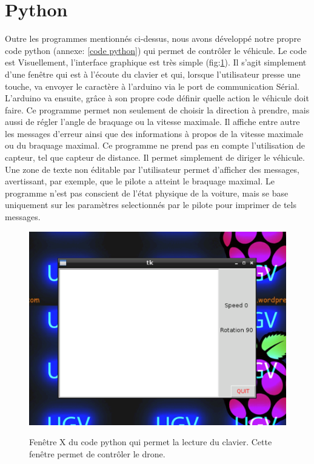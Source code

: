 \documentclass[a4paper,12pt]{report}
\begin{document}
{\section{Python}
Outre les programmes mentionnés ci-dessus, nous avons développé notre propre
code python (annexe: \ref{code python}) qui permet de contrôler le
véhicule. Le code est  Visuellement, l'interface graphique est très simple
(fig:\ref{python environnement}). Il s'agit simplement d'une fenêtre qui est à
l'écoute du clavier et qui, lorsque l'utilisateur presse une touche, va
envoyer le caractère à l'arduino via le port de communication
Sérial. L'arduino va ensuite, grâce à son propre code définir quelle action le
véhicule doit faire. Ce programme permet non seulement de choisir la direction
à prendre, mais aussi de régler l'angle de braquage ou la vitesse maximale. Il
affiche entre autre les messages d'erreur ainsi que des informations à propos
de la vitesse maximale ou du braquage maximal. Ce programme ne prend pas en
compte l'utilisation de capteur, tel que capteur de distance. Il permet
simplement de diriger le véhicule. Une zone de texte non éditable par
l'utilisateur permet d'afficher des messages, avertissant, par exemple, que le
pilote a atteint le braquage maximal. Le programme n'est pas conscient de
l'état physique de la voiture, mais se base uniquement sur les paramètres
selectionnés par le pilote pour imprimer de tels messages. 

\begin{center}
\begin{figure}[!h]
\includegraphics[scale=1]{python-environnement}\label{python environnement}
\caption{Fenêtre X du code python qui permet la lecture du clavier. Cette fenêtre permet de contrôler le drone.}
\end{figure}
\end{center}



}
\end{document}
